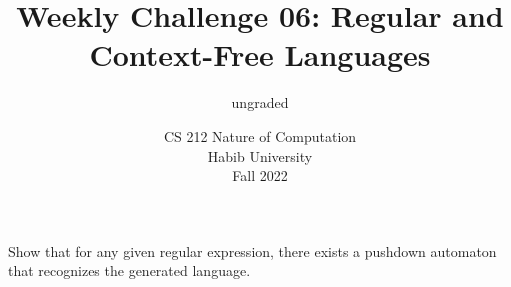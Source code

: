\documentclass[a4paper]{exam}
\title{Weekly Challenge 06: Regular and Context-Free Languages}
\author{ungraded} %
\date{CS 212 Nature of Computation\\Habib University\\Fall 2022}
\begin{document}
\maketitle

\begin{questions}
  

  Show that for any given regular expression, there exists a pushdown automaton that recognizes the generated language.
  
  \begin{solution}
  \end{solution}
\end{questions}
\end{document}
